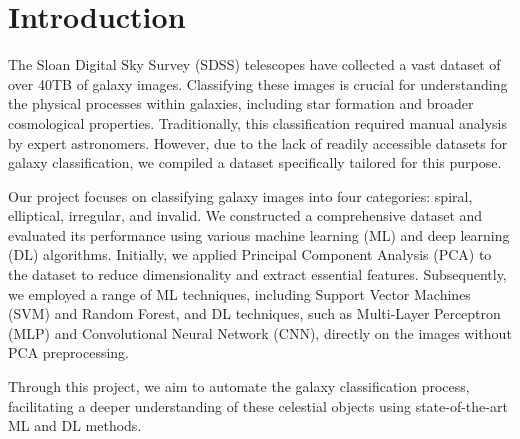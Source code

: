\section{Introduction}
\label{sec:intro}

The Sloan Digital Sky Survey (SDSS) telescopes have collected a vast dataset of over 40TB of galaxy images. Classifying these images is crucial for understanding the physical processes within galaxies, including star formation and broader cosmological properties. Traditionally, this classification required manual analysis by expert astronomers. However, due to the lack of readily accessible datasets for galaxy classification, we compiled a dataset specifically tailored for this purpose.

Our project focuses on classifying galaxy images into four categories: spiral, elliptical, irregular, and invalid. We constructed a comprehensive dataset and evaluated its performance using various machine learning (ML) and deep learning (DL) algorithms. Initially, we applied Principal Component Analysis (PCA) to the dataset to reduce dimensionality and extract essential features. Subsequently, we employed a range of ML techniques, including Support Vector Machines (SVM) and Random Forest, and DL techniques, such as Multi-Layer Perceptron (MLP) and Convolutional Neural Network (CNN), directly on the images without PCA preprocessing.

Through this project, we aim to automate the galaxy classification process, facilitating a deeper understanding of these celestial objects using state-of-the-art ML and DL methods.



